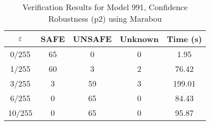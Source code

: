 \begin{table}[htbp]
\centering
\caption{Verification Results for Model 991, Confidence Robustness (p2) using Marabou}
\label{tab:model991_p2_marabou}
\begin{tabular}{|c|c|c|c|c|}
\hline
$\varepsilon$ & SAFE & UNSAFE & Unknown & Time (s) \\ \hline
0/255 & 65 & 0 & 0 & 1.95 \\ \hline
1/255 & 60 & 3 & 2 & 76.42 \\ \hline
3/255 & 3 & 59 & 3 & 199.01 \\ \hline
6/255 & 0 & 65 & 0 & 84.43 \\ \hline
10/255 & 0 & 65 & 0 & 95.87 \\ \hline
\end{tabular}
\end{table}

